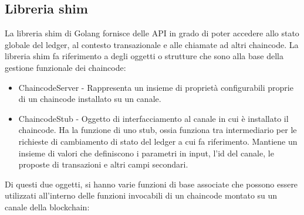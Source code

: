 \subsection{Libreria shim}
La libreria shim di Golang fornisce delle API in grado di poter accedere allo stato globale del ledger, al contesto transazionale e alle chiamate ad altri chaincode. La libreria shim fa riferimento a degli oggetti o strutture che sono alla base della gestione funzionale dei chaincode: 
\begin{itemize}
    \item ChaincodeServer - Rappresenta un insieme di proprietà configurabili proprie di un chaincode installato su un canale.
    \item ChaincodeStub - Oggetto di interfacciamento al canale in cui è installato il chaincode. Ha la funzione di uno stub, ossia funziona tra intermediario per le richieste di cambiamento di stato del ledger a cui fa riferimento. Mantiene un insieme di valori che definiscono i parametri in input, l'id del canale, le proposte di transazioni e altri campi secondari. 
\end{itemize}
\newpage
Di questi due oggetti, si hanno varie funzioni di base associate che possono essere utilizzati all'interno delle funzioni invocabili di un chaincode montato su un canale della blockchain: 
